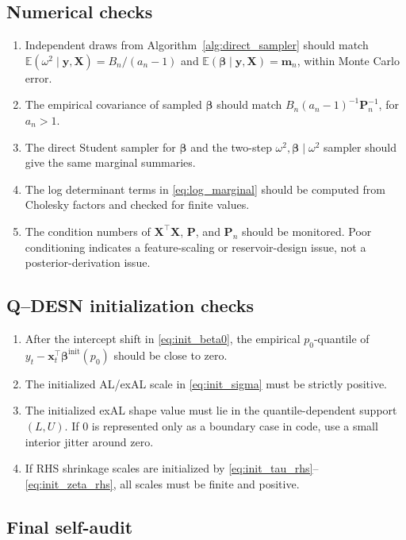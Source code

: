 \documentclass[11pt]{article}
\newcommand{\E}{\mathbb{E}}
\newcommand{\vect}[1]{\bm{#1}}
\newcommand{\mat}[1]{\bm{#1}}
\begin{document}
\subsection{Numerical checks}

\begin{enumerate}[label=(\alph*)]
\item Independent draws from Algorithm~\ref{alg:direct_sampler} should match
\(\E(\omega^2\mid\vect y,\mat X)=B_n/(a_n-1)\) and
\(\E(\vect\beta\mid\vect y,\mat X)=\vect m_n\), within Monte Carlo error.
\item The empirical covariance of sampled \(\vect\beta\) should match
\(B_n(a_n-1)^{-1}\mat P_n^{-1}\), for \(a_n>1\).
\item The direct Student sampler for \(\vect\beta\) and the two-step
\(\omega^2,\vect\beta\mid\omega^2\) sampler should give the same marginal
summaries.
\item The log determinant terms in \eqref{eq:log_marginal} should be computed
from Cholesky factors and checked for finite values.
\item The condition numbers of \(\mat X^\top\mat X\), \(\mat P\), and
\(\mat P_n\) should be monitored. Poor conditioning indicates a feature-scaling
or reservoir-design issue, not a posterior-derivation issue.
\end{enumerate}

\subsection{Q--DESN initialization checks}

\begin{enumerate}[label=(\alph*)]
\item After the intercept shift in \eqref{eq:init_beta0}, the empirical
\(p_0\)-quantile of
\(y_t-\vect x_t^\top\vect\beta^{\mathrm{init}}(p_0)\) should be close to zero.
\item The initialized AL/exAL scale in \eqref{eq:init_sigma} must be strictly
positive.
\item The initialized exAL shape value must lie in the quantile-dependent
support \((L,U)\). If \(0\) is represented only as a boundary case in code, use
a small interior jitter around zero.
\item If RHS shrinkage scales are initialized by
\eqref{eq:init_tau_rhs}--\eqref{eq:init_zeta_rhs}, all scales must be finite and
positive.
\end{enumerate}

\subsection{Final self-audit}
\end{document}
